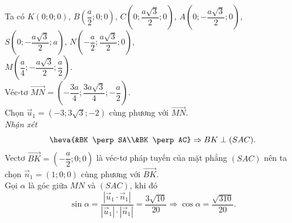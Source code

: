 \begin{bt}
{\begin{center}
		\end{center}
		Ta có 
		$K(0;0;0)$, $B\left(\dfrac{a}{2};0;0\right)$,  $C\left(0;\dfrac{a\sqrt{3}}{2};0\right)$, $A\left(0;-\dfrac{a\sqrt{3}}{2};0\right)$,
		 $S\left(0;-\dfrac{a\sqrt{3}}{2};a\right)$, $N\left(-\dfrac{a}{2};\dfrac{a\sqrt{3}}{2};0\right)$,\\ $M\left(\dfrac{a}{4};-\dfrac{a\sqrt{3}}{2};\dfrac{a}{2}\right)$.\\
		Véc-tơ $\overrightarrow{MN} = \left(-\dfrac{3a}{4}; \dfrac{3a\sqrt{3}}{4}; -\dfrac{a}{2}\right)$.\\ 
		Chọn $\overrightarrow{u}_1 = (-3; 3\sqrt{3}; -2)$ cùng  phương với $\overrightarrow{MN}$.\\
		 \textit{Nhận xét}
		$$\heva{&BK \perp SA\\&BK \perp AC}\Rightarrow BK \perp  (SAC).$$
		Vectơ $\overrightarrow{BK} = \left(-\dfrac{a}{2}; 0; 0\right)$ là véc-tơ pháp tuyến của mặt phẳng  $(SAC)$ nên ta chọn $\overrightarrow{n}_1 = (1;0;0)$ cùng phương với $\overrightarrow{BK}$.\\
		Gọi $\alpha$ là góc giữa $MN$ và $(SAC)$, khi  đó
		$$ 
		\sin\alpha = \dfrac{\left|\overrightarrow{u}_1 \cdot \overrightarrow{n}_1\right|}{\left|\overrightarrow{u}_1\right| \cdot \left|\overrightarrow{n}_1\right|} = \dfrac{3\sqrt{10}}{20} \Rightarrow \cos\alpha =  \dfrac{\sqrt{310}}{20}.
		 $$
	} 
\end{bt}

